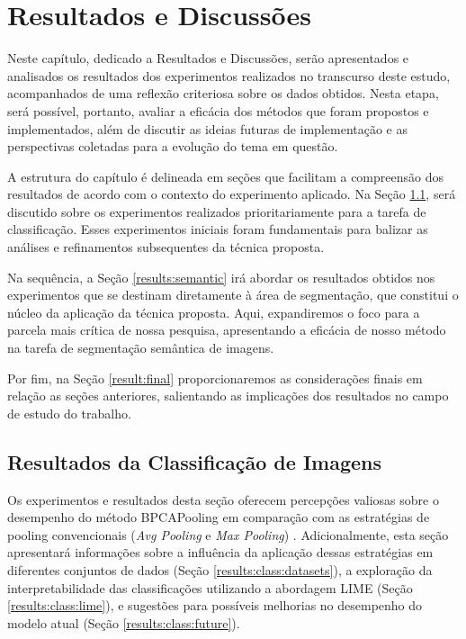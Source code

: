 \newpage
\clearpage

\section{Resultados e Discussões}
\label{results}
Neste capítulo, dedicado a Resultados e Discussões, serão apresentados e analisados os resultados dos experimentos realizados no transcurso deste estudo, acompanhados de uma reflexão criteriosa sobre os dados obtidos. Nesta etapa, será possível, portanto, avaliar a eficácia dos métodos que foram propostos e implementados, além de discutir as ideias futuras de implementação e as perspectivas coletadas para a evolução do tema em questão.

A estrutura do capítulo é delineada em seções que facilitam a compreensão dos resultados de acordo com o contexto do experimento aplicado. Na Seção \ref{results:class}, será discutido sobre os experimentos realizados prioritariamente para a tarefa de classificação. Esses experimentos iniciais foram fundamentais para balizar as análises e refinamentos subsequentes da técnica proposta.

Na sequência, a Seção \ref{results:semantic} irá abordar os resultados obtidos nos experimentos que se destinam diretamente à área de segmentação, que constitui o núcleo da aplicação da técnica proposta. Aqui, expandiremos o foco para a parcela mais crítica de nossa pesquisa, apresentando a eficácia de nosso método na tarefa de segmentação semântica de imagens.

Por fim, na Seção \ref{result:final} proporcionaremos as considerações finais em relação as seções anteriores, salientando as implicações dos resultados no campo de estudo do trabalho.

\subsection{Resultados da Classificação de Imagens}
\label{results:class}
Os experimentos e resultados desta seção oferecem percepções valiosas sobre o desempenho do método BPCAPooling em comparação com as estratégias de pooling convencionais (\textit{Avg Pooling} e \textit{Max Pooling}) \citep{Ozdemir2023Avg-topk:Networks}. Adicionalmente, esta seção apresentará informações sobre a influência da aplicação dessas estratégias em diferentes conjuntos de dados (Seção \ref{results:class:datasets}), a exploração da interpretabilidade das classificações utilizando a abordagem LIME (Seção \ref{results:class:lime}), e sugestões para possíveis melhorias no desempenho do modelo atual (Seção \ref{results:class:future}).

